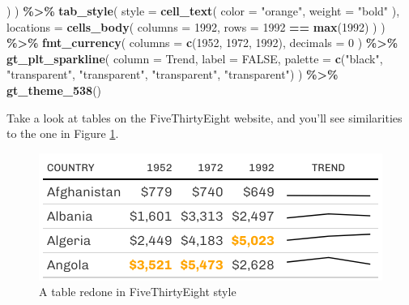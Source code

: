 \documentclass[
]{book}
\newenvironment{Shaded}{\begin{snugshade}}{\end{snugshade}}
\newcommand{\AttributeTok}[1]{\textcolor[rgb]{0.13,0.29,0.53}{#1}}
\newcommand{\ConstantTok}[1]{\textcolor[rgb]{0.56,0.35,0.01}{#1}}
\newcommand{\DecValTok}[1]{\textcolor[rgb]{0.00,0.00,0.81}{#1}}
\newcommand{\FunctionTok}[1]{\textcolor[rgb]{0.13,0.29,0.53}{\textbf{#1}}}
\newcommand{\NormalTok}[1]{#1}
\newcommand{\SpecialCharTok}[1]{\textcolor[rgb]{0.81,0.36,0.00}{\textbf{#1}}}
\newcommand{\StringTok}[1]{\textcolor[rgb]{0.31,0.60,0.02}{#1}}
\begin{document}
\begin{Shaded}
\begin{Highlighting}[]
\NormalTok{    )}
\NormalTok{  ) }\SpecialCharTok{\%\textgreater{}\%}
  \FunctionTok{tab\_style}\NormalTok{(}
    \AttributeTok{style =} \FunctionTok{cell\_text}\NormalTok{(}
      \AttributeTok{color =} \StringTok{"orange"}\NormalTok{,}
      \AttributeTok{weight =} \StringTok{"bold"}
\NormalTok{    ),}
    \AttributeTok{locations =} \FunctionTok{cells\_body}\NormalTok{(}
      \AttributeTok{columns =} \StringTok{\textasciigrave{}}\AttributeTok{1992}\StringTok{\textasciigrave{}}\NormalTok{,}
      \AttributeTok{rows =} \StringTok{\textasciigrave{}}\AttributeTok{1992}\StringTok{\textasciigrave{}} \SpecialCharTok{==} \FunctionTok{max}\NormalTok{(}\StringTok{\textasciigrave{}}\AttributeTok{1992}\StringTok{\textasciigrave{}}\NormalTok{)}
\NormalTok{    )}
\NormalTok{  ) }\SpecialCharTok{\%\textgreater{}\%}
  \FunctionTok{fmt\_currency}\NormalTok{(}
    \AttributeTok{columns =} \FunctionTok{c}\NormalTok{(}\StringTok{\textasciigrave{}}\AttributeTok{1952}\StringTok{\textasciigrave{}}\NormalTok{, }\StringTok{\textasciigrave{}}\AttributeTok{1972}\StringTok{\textasciigrave{}}\NormalTok{, }\StringTok{\textasciigrave{}}\AttributeTok{1992}\StringTok{\textasciigrave{}}\NormalTok{),}
    \AttributeTok{decimals =} \DecValTok{0}
\NormalTok{  ) }\SpecialCharTok{\%\textgreater{}\%}
  \FunctionTok{gt\_plt\_sparkline}\NormalTok{(}
    \AttributeTok{column =}\NormalTok{ Trend,}
    \AttributeTok{label =} \ConstantTok{FALSE}\NormalTok{,}
    \AttributeTok{palette =} \FunctionTok{c}\NormalTok{(}\StringTok{"black"}\NormalTok{, }\StringTok{"transparent"}\NormalTok{, }\StringTok{"transparent"}\NormalTok{, }\StringTok{"transparent"}\NormalTok{, }\StringTok{"transparent"}\NormalTok{)}
\NormalTok{  ) }\SpecialCharTok{\%\textgreater{}\%}
  \FunctionTok{gt\_theme\_538}\NormalTok{()}
\end{Highlighting}
\end{Shaded}

Take a look at tables on the FiveThirtyEight website, and you'll see similarities to the one in Figure \ref{fig:table-fivethirtyeight}.

\begin{figure}
\includegraphics[width=1\linewidth]{nostarch/temp/F05012} \caption{A table redone in FiveThirtyEight style}\label{fig:table-fivethirtyeight}
\end{figure}
\end{document}
